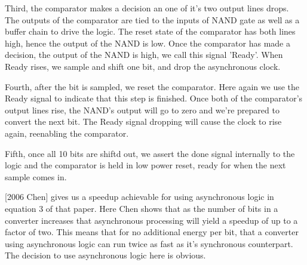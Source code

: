 \documentclass[10pt,journal]{IEEEtran}\usepackage{longtable}
\begin{document}
Third, the comparator makes a decision an one of it's two output lines drops. 
The outputs of the comparator are tied to the inputs of NAND gate as well as a buffer chain to drive the logic.
The reset state of the comparator has both lines high, hence the output of the NAND is low.
Once the comparator has made a decision, the output of the NAND is high, we call this signal 'Ready'. When Ready rises, we sample and shift one bit, and drop the asynchronous clock.

Fourth, after the bit is sampled, we reset the comparator. Here again we use the Ready signal to indicate that this step is finished. Once both of the comparator's output lines rise, the NAND's output will go to zero and we're prepared to convert the next bit. The Ready signal dropping will cause the clock to rise again, reenabling the comparator.

Fifth, once all 10 bits are shiftd out, we assert the done signal internally to the logic and the comparator is held in low power reset, ready for when the next sample comes in.

[2006 Chen] gives us a speedup achievable for using asynchronous logic in equation 3 of that paper. Here Chen shows that as the number of bits in a converter increases that asynchronous processing will yield a speedup of up to a factor of two.
This means that for no additional energy per bit, that a converter using asynchronous logic can run twice as fast as it's synchronous counterpart. The decision to use asynchronous logic here is obvious.






\end{document}
